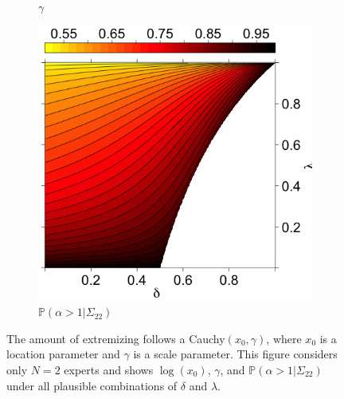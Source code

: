 \documentclass[11pt]{article}
\renewcommand{\P}{\mathbb{P}}
\theoremstyle{definition}
\theoremstyle{definition}
\begin{document}
\begin{figure}[t]
\begin{subfigure}[b]{0.33\textwidth}
\caption{$\gamma$}
\label{gammaOracle}
        \end{subfigure}
\hspace{-1.3em}
        \begin{subfigure}[b]{0.33\textwidth}
                \includegraphics[width=1.07\textwidth, height = \textwidth]{Probs}
\caption{$\P(\alpha > 1 | \Sigma_{22})$}
\label{probOracle}
        \end{subfigure}

        \caption{ The amount of extremizing follows a Cauchy$(x_0, \gamma)$, where $x_0$ is a location parameter and $\gamma$ is a scale parameter. This figure considers only $N = 2$ experts and shows $\log(x_0)$, $\gamma$, and $\P(\alpha > 1 | \Sigma_{22})$ under all plausible combinations of $\delta$ and $\lambda$.}
        \label{LevelplotsOracle}
\end{figure}
 
\end{document}
